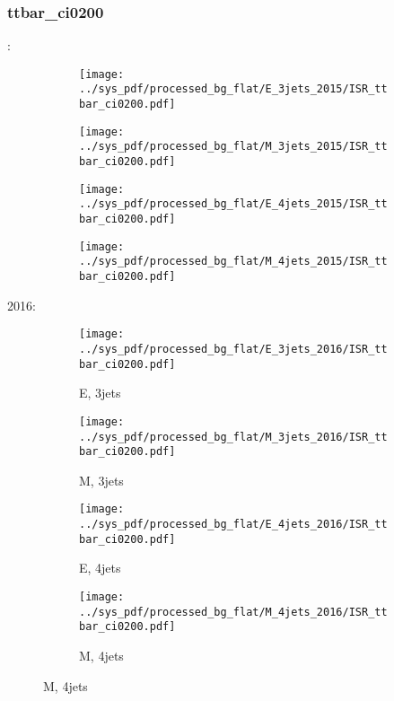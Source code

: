 \documentclass{beamer}
\begin{document}
\begin{frame}
\frametitle{ttbar_ci0200}
\fontsize{5}{1}:
\begin{figure}
\centering
\begin{subfigure}[b]{0.24\textwidth}
\texttt{[image: ../sys\_pdf/processed\_bg\_flat/E\_3jets\_2015/ISR\_ttbar\_ci0200.pdf]}
\end{subfigure}
\begin{subfigure}[b]{0.24\textwidth}
\texttt{[image: ../sys\_pdf/processed\_bg\_flat/M\_3jets\_2015/ISR\_ttbar\_ci0200.pdf]}
\end{subfigure}
\begin{subfigure}[b]{0.24\textwidth}
\texttt{[image: ../sys\_pdf/processed\_bg\_flat/E\_4jets\_2015/ISR\_ttbar\_ci0200.pdf]}
\end{subfigure}
\begin{subfigure}[b]{0.24\textwidth}
\texttt{[image: ../sys\_pdf/processed\_bg\_flat/M\_4jets\_2015/ISR\_ttbar\_ci0200.pdf]}
\end{subfigure}
\end{figure}
2016:
\begin{figure}
\centering
\begin{subfigure}[b]{0.24\textwidth}
\texttt{[image: ../sys\_pdf/processed\_bg\_flat/E\_3jets\_2016/ISR\_ttbar\_ci0200.pdf]}
\captionsetup{font=tiny}
\caption{E, 3jets}
\end{subfigure}
\begin{subfigure}[b]{0.24\textwidth}
\texttt{[image: ../sys\_pdf/processed\_bg\_flat/M\_3jets\_2016/ISR\_ttbar\_ci0200.pdf]}
\captionsetup{font=tiny}
\caption{M, 3jets}
\end{subfigure}
\begin{subfigure}[b]{0.24\textwidth}
\texttt{[image: ../sys\_pdf/processed\_bg\_flat/E\_4jets\_2016/ISR\_ttbar\_ci0200.pdf]}
\captionsetup{font=tiny}
\caption{E, 4jets}
\end{subfigure}
\begin{subfigure}[b]{0.24\textwidth}
\texttt{[image: ../sys\_pdf/processed\_bg\_flat/M\_4jets\_2016/ISR\_ttbar\_ci0200.pdf]}
\captionsetup{font=tiny}
\caption{M, 4jets}
\end{subfigure}
\end{figure}
\end{frame}
\end{document}
